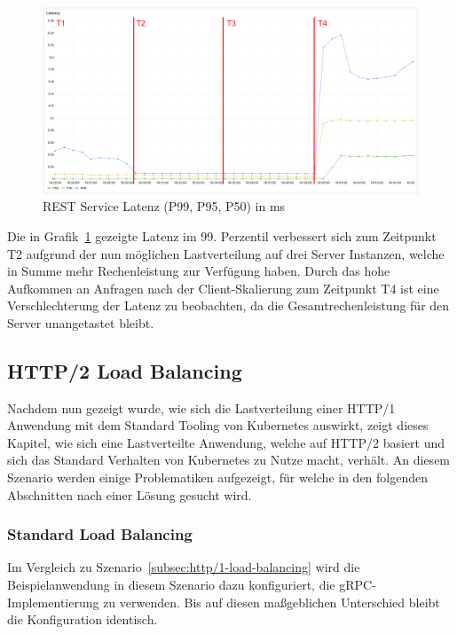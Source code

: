 \begin{figure}[H]
    \centering
    \includegraphics[width=1\textwidth]{img/rest_latenz}
    \caption{REST Service Latenz (P99, P95, P50) in ms}
    \label{fig:rest_latenz}
\end{figure}

Die in Grafik~\ref{fig:rest_latenz} gezeigte Latenz im 99. Perzentil verbessert sich zum Zeitpunkt T2 aufgrund der nun möglichen Lastverteilung auf drei Server Instanzen, welche in Summe mehr Rechenleistung zur Verfügung haben.
Durch das hohe Aufkommen an Anfragen nach der Client-Skalierung zum Zeitpunkt T4 ist eine Verschlechterung der Latenz zu beobachten, da die Gesamtrechenleistung für den Server unangetastet bleibt.

\subsection{HTTP/2 Load Balancing}\label{subsec:http/2-load-balancing}

Nachdem nun gezeigt wurde, wie sich die Lastverteilung einer HTTP/1 Anwendung mit dem Standard Tooling von Kubernetes auswirkt, zeigt dieses Kapitel, wie sich eine Lastverteilte Anwendung, welche auf HTTP/2 basiert und sich das Standard Verhalten von Kubernetes zu Nutze macht, verhält.
An diesem Szenario werden einige Problematiken aufgezeigt, für welche in den folgenden Abschnitten nach einer Lösung gesucht wird.

\subsubsection{Standard Load Balancing}\label{subsubsec:standard}

Im Vergleich zu Szenario~\ref{subsec:http/1-load-balancing} wird die Beispielanwendung in diesem Szenario dazu konfiguriert, die gRPC-Implementierung zu verwenden.
Bis auf diesen maßgeblichen Unterschied bleibt die Konfiguration identisch.

